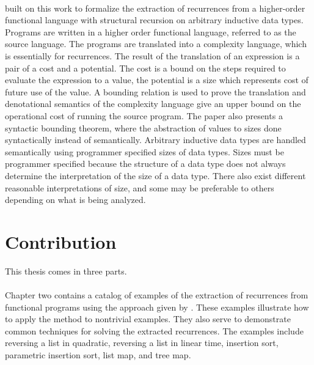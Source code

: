 \paragraph{}
\citet{Danner2015} built on this work to formalize the extraction
of recurrences from a higher-order functional language with structural
recursion on arbitrary inductive data types. Programs are written in a higher
order functional language, referred to as the source language. The programs are
translated into a complexity language, which is essentially for recurrences.
The result of the translation of an expression is a pair of a cost and a
potential. The cost is a bound on the steps required to evaluate the expression
to a value, the potential is a size which represents cost of future use of the
value. A bounding relation is used to prove the translation and denotational
semantics of the complexity language give an upper bound on the operational
cost of running the source program. The paper also presents a syntactic
bounding theorem, where the abstraction of values to sizes done syntactically
instead of semantically.  Arbitrary inductive data types are handled
semantically using programmer specified sizes of data types. Sizes must be
programmer specified because the structure of a data type does not always
determine the interpretation of the size of a data type. There also exist
different reasonable interpretations of size, and some may be preferable to
others depending on what is being analyzed.


\section{Contribution}

This thesis comes in three parts.
\paragraph{}
Chapter two contains a catalog of examples of the extraction of recurrences
from functional programs using the approach given by \citet{Danner2015}. These
examples illustrate how to apply the method to nontrivial examples. They also
serve to demonstrate common techniques for solving the extracted recurrences.
The examples include reversing a list in quadratic, reversing a list in linear
time, insertion sort, parametric insertion sort, list map, and tree map.



